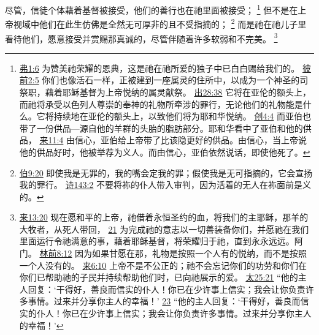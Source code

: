 \documentclass[12pt, a4paper, oneside]{ctexart}
\newcounter{parnum}[section]
\newcommand{\N}{%
   \noindent\refstepcounter{parnum}%
    \makebox[\parindent][l]{\textbf{\arabic{parnum}.}}}
\begin{document}
\N 尽管，信徒个体藉着基督被接受，他们的善行也在祂里面被接受；
	\footnote {
		\href{https://biblehub.com/ephesians/1-6.htm}{弗1:6} 为赞美祂荣耀的恩典，这是祂在祂所爱的独子中已白白赐给我们的。
		\href{https://biblehub.com/1_peter/2-5.htm}{彼前2:5} 你们也像活石一样，正被建到一座属灵的住所中，以成为一个神圣的司祭职，藉着耶稣基督为上帝悦纳的属灵献祭。
		\href{https://biblehub.com/exodus/28-38.htm}{出28:38} 它将在亚伦的额头上，而祂将承受以色列人尊崇的奉神的礼物所牵涉的罪行，无论他们的礼物能是什么。它将持续地在亚伦的额头上，以致他们将为耶和华悦纳。
		\href{https://biblehub.com/genesis/4-4.htm}{创4:4} 而亚伯也带了一份供品---源自他的羊群的头胎的脂肪部分。耶和华看中了亚伯和他的供品，
		\href{https://biblehub.com/hebrews/11-4.htm}{来11:4} 由信心，亚伯给上帝带了比该隐更好的供品。由信心，当上帝说他的供品好时，他被举荐为义人。而由信心，亚伯依然说话，即使他死了。
	}
	但不是在上帝视域中他们在此生仿佛是全然无可厚非的且不受指摘的；
	\footnote {
		\href{https://biblehub.com/job/9-20.htm}{伯9:20} 即使我是无罪的，我的嘴会定我的罪；假使我是无可指摘的，它会宣扬我的罪行。
		\href{https://biblehub.com/psalms/143-2.htm}{诗143:2} 不要将祢的仆人带入审判，因为活着的无人在祢面前是义的。
	}
	而是祂在祂儿子里看待他们，愿意接受并赏赐那真诚的，尽管伴随着许多软弱和不完美。
	\footnote {
		\href{https://biblehub.com/hebrews/13-20.htm}{来13:20} 现在愿和平的上帝，祂借着永恒圣约的血，将我们的主耶稣，那羊的大牧者，从死人带回，
		\href{https://biblehub.com/hebrews/13-21.htm}{21} 为完成祂的意志以一切善装备你们，并愿祂在我们里面运行令祂满意的事，藉着耶稣基督，将荣耀归于祂，直到永永远远。阿门。
		\href{https://biblehub.com/2_corinthians/8-12.htm}{林前8:12} 因为如果甘愿在那，礼物是按照一个人有的悦纳，而不是按照一个人没有的。
		\href{https://biblehub.com/hebrews/6-10.htm}{来6:10} 上帝不是不公正的；祂不会忘记你们的功劳和你们在你们已帮助祂的子民并持续帮助他们时，已向祂展示的爱。
		\href{https://biblehub.com/matthew/25-21.htm}{太25:21} “他的主人回复：‘干得好，善良而信实的仆人！你已在少许事上信实；我会让你负责许多事情。过来并分享你主人的幸福！’
		\href{https://biblehub.com/matthew/25-23.htm}{23} “他的主人回复：‘干得好，善良而信实的仆人！你已在少许事上信实；我会让你负责许多事情。过来并分享你主人的幸福！’
	}
\end{document}

